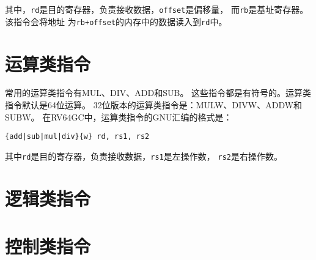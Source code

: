 \documentclass[a4paper, oneside, twocolumn]{ctexbook}
\begin{document}
其中，\verb|rd|是目的寄存器，负责接收数据，\verb|offset|是偏移量，
而\verb|rb|是基址寄存器。该指令会将地址
为\verb#rb+offset#的内存中的数据读入到\verb|rd|中。

\section{运算类指令}
常用的运算类指令有MUL、DIV、ADD和SUB。
这些指令都是有符号的。运算类指令默认是64位运算。
32位版本的运算类指令是：MULW、DIVW、ADDW和SUBW。
在RV64GC中，运算类指令的GNU汇编的格式是：

\begin{center}
\verb+{add|sub|mul|div}{w} rd, rs1, rs2+
\end{center}

其中\verb|rd|是目的寄存器，负责接收数据，\verb|rs1|是左操作数，
\verb|rs2|是右操作数。

\section{逻辑类指令}

\section{控制类指令}
\end{document}

